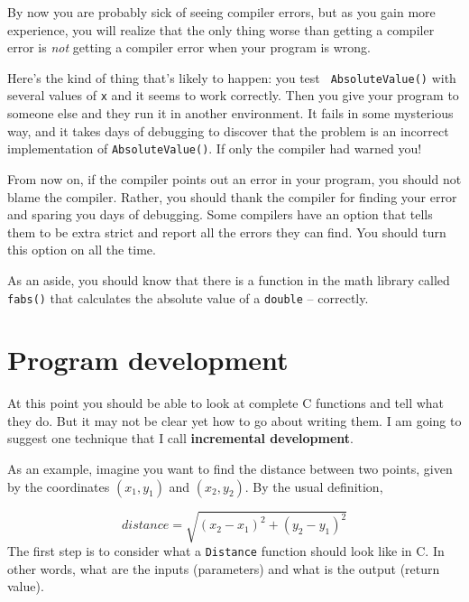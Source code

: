
By now you are probably sick of seeing compiler errors, but as you
gain more experience, you will realize that the only thing worse
than getting a compiler error is {\em not} getting a compiler error
when your program is wrong.

Here's the kind of thing that's likely to happen: you test {\tt
AbsoluteValue()} with several values of {\tt x} and it seems to work
correctly.  Then you give your program to someone else and they run it
in another environment.  It fails in some mysterious way, and it
takes days of debugging to discover that the problem is an
incorrect implementation of {\tt AbsoluteValue()}.  If only the
compiler had warned you!


From now on, if the compiler points out an error in your program, you
should not blame the compiler.  Rather, you should thank the compiler
for finding your error and sparing you days of debugging.  Some
compilers have an option that tells them to be extra strict and report
all the errors they can find.  You should turn this option on all the
time.


As an aside, you should know that there is a function in the
math library called {\tt fabs()} that calculates the absolute
value of a {\tt double} -- correctly.

\section{Program development}
\label{distance}

At this point you should be able to look at complete C functions
and tell what they do.  But it may not be clear yet how to go
about writing them.  I am going to suggest one technique that
I call {\bf incremental development}.


As an example, imagine you want to find the distance between two
points, given by the coordinates $(x_1, y_1)$ and $(x_2, y_2)$.  By
the usual definition,

\begin{equation}
distance = \sqrt{(x_2 - x_1)^2 + (y_2 - y_1)^2}
\end{equation}
%
The first step is to consider what a {\tt Distance} function
should look like in C.  In other words, what are the inputs
(parameters) and what is the output (return value).

